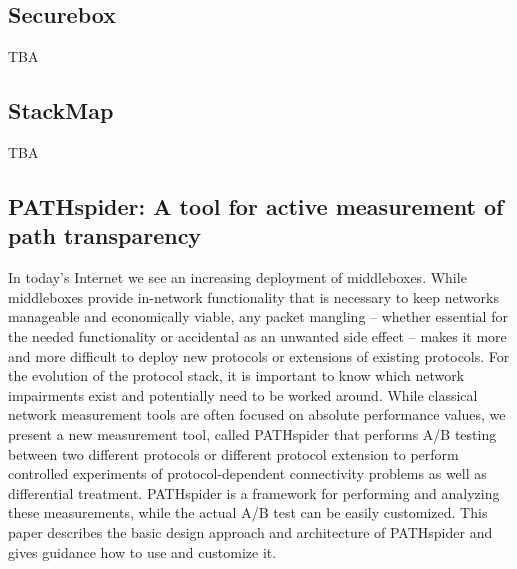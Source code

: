 \subsection{Securebox}

TBA

\subsection{StackMap}

TBA

\subsection{PATHspider: A tool for active measurement of path transparency}

In today’s Internet we see an increasing deployment of middleboxes. While
middleboxes provide in-network functionality that is necessary to keep
networks manageable and economically viable, any packet mangling – whether
essential for the needed functionality or accidental as an unwanted side
effect – makes it more and more difficult to deploy new protocols or
extensions of existing protocols. For the evolution of the protocol stack,
it is important to know which network impairments exist and potentially
need to be worked around. While classical network measurement tools are
often focused on absolute performance values, we present a new measurement
tool, called PATHspider that performs A/B testing between two different
protocols or different protocol extension to perform controlled experiments
of protocol-dependent connectivity problems as well as differential treatment.
PATHspider is a framework for performing and analyzing these measurements,
while the actual A/B test can be easily customized. This paper describes the
basic design approach and architecture of PATHspider and gives guidance how
to use and customize it.
